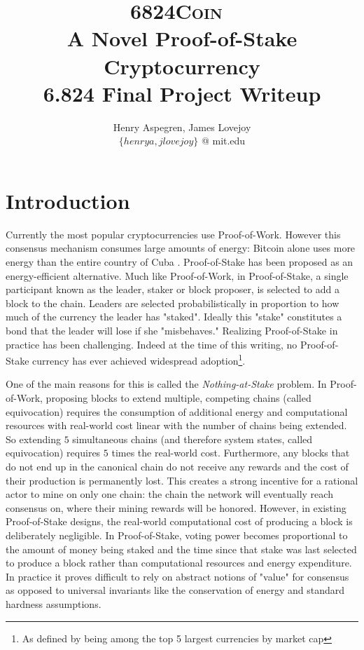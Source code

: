 \documentclass{article}
\newcommand{\coin}{ \textsc{6824Coin}\ }
\begin{document}
\title{%
  \coin \\ 
  A Novel Proof-of-Stake Cryptocurrency\\
  \large 6.824 Final Project Writeup}
\author{Henry Aspegren, James Lovejoy \\ $\{ henrya, jlovejoy \}$ @ mit.edu}
\maketitle

\section{Introduction}

Currently the most popular cryptocurrencies use Proof-of-Work. However this consensus mechanism consumes large amounts of energy: Bitcoin alone uses more energy than the entire country of Cuba \cite{energy}. Proof-of-Stake has been proposed as an energy-efficient alternative. Much like Proof-of-Work, in Proof-of-Stake, a single participant known as the leader, staker or block proposer, is selected to add a block to the chain. Leaders are selected probabilistically in proportion to how much of the currency the leader has "staked". Ideally this "stake" constitutes a bond that the leader will lose if she "misbehaves." Realizing Proof-of-Stake in practice has been challenging. Indeed at the time of this writing, no Proof-of-Stake currency has ever achieved widespread adoption\footnote{As defined by being among the top 5 largest currencies by market cap}. 

One of the main reasons for this is called the \textit{Nothing-at-Stake} problem. In Proof-of-Work, proposing blocks to extend multiple, competing chains (called equivocation) requires the consumption of additional energy and computational resources with real-world cost linear with the number of chains being extended. So extending $ 5 $ simultaneous chains (and therefore system states, called equivocation) requires $ 5 $ times the real-world cost. Furthermore, any blocks that do not end up in the canonical chain do not receive any rewards and the cost of their production is permanently lost. This creates a strong incentive for a rational actor to mine on only one chain: the chain the network will eventually reach consensus on, where their mining rewards will be honored. However, in existing Proof-of-Stake designs, the real-world computational cost of producing a block is deliberately negligible. In Proof-of-Stake, voting power becomes proportional to the amount of money being staked and the time since that stake was last selected to produce a block rather than computational resources and energy expenditure. In practice it proves difficult to rely on abstract notions of "value" for consensus as opposed to universal invariants like the conservation of energy and standard hardness assumptions. 
\end{document}
